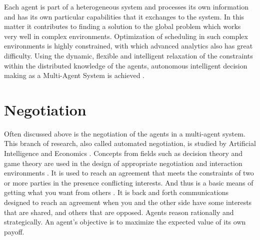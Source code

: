 Each agent is part of a heterogeneous system and processes its own information and has its own particular capabilities that it exchanges to the system. In this matter it contributes to finding a solution to the global problem which works very well in complex environments. Optimization of scheduling in such complex environments is highly constrained, with which advanced analytics also has great difficulty. Using the dynamic, flexible and intelligent relaxation of the constraints within the distributed knowledge of the agents, autonomous intelligent decision making as a Multi-Agent System is achieved \citep{rabelo1999multi}. 





\section{Negotiation}
\label{sec:negotiation}
Often discussed above is the negotiation of the agents in a multi-agent system. This branch of research, also called automated negotiation, is studied by Artificial Intelligence and Economics \citep{jennings2001automated}. Concepts from fields such as decision theory and game theory are used in the design of appropriate negotiation and interaction environments \citep{jennings2001automated}. It is used to reach an agreement that meets the constraints of two or more parties in the presence conflicting interests. And thus is a basic means of getting what you want from others \citep{fisher1987getting}. It is back and forth communications designed to reach an agreement when you and the other side have some interests that are shared, and others that are opposed. Agents reason rationally and strategically. An agent's objective is to maximize the expected value of its own payoff. 

